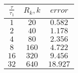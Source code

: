 \begin{tabular}{| c | c | c |}
\hline

$\frac{\tau}{\tau_1}$ & $R_k, k$ & $error$ \\
\hline
$1$ & $20$ & $0.582$\\
\hline
$2$ & $40$ & $1.178$\\
\hline
$4$ & $80$ & $2.356$\\
\hline
$8$ & $160$ & $4.722$\\
\hline
$16$ & $320$ & $9.456$\\
\hline
$32$ & $640$ & $18.927$\\
\hline
\end{tabular}
